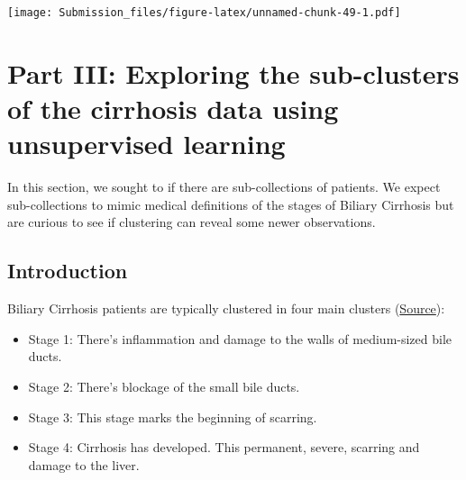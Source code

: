 \documentclass[
]{article}
\newenvironment{Shaded}{\begin{snugshade}}{\end{snugshade}}
\newcommand{\AttributeTok}[1]{\textcolor[rgb]{0.13,0.29,0.53}{#1}}
\newcommand{\CommentTok}[1]{\textcolor[rgb]{0.56,0.35,0.01}{\textit{#1}}}
\newcommand{\ConstantTok}[1]{\textcolor[rgb]{0.56,0.35,0.01}{#1}}
\newcommand{\DecValTok}[1]{\textcolor[rgb]{0.00,0.00,0.81}{#1}}
\newcommand{\FunctionTok}[1]{\textcolor[rgb]{0.13,0.29,0.53}{\textbf{#1}}}
\newcommand{\NormalTok}[1]{#1}
\newcommand{\SpecialCharTok}[1]{\textcolor[rgb]{0.81,0.36,0.00}{\textbf{#1}}}
\newcommand{\StringTok}[1]{\textcolor[rgb]{0.31,0.60,0.02}{#1}}
\begin{document}
\begin{Shaded}
\end{Shaded}

\texttt{[image: Submission\_files/figure-latex/unnamed-chunk-49-1.pdf]}

\hypertarget{part-iii-exploring-the-sub-clusters-of-the-cirrhosis-data-using-unsupervised-learning}{%
\section{Part III: Exploring the sub-clusters of the cirrhosis data
using unsupervised
learning}\label{part-iii-exploring-the-sub-clusters-of-the-cirrhosis-data-using-unsupervised-learning}}

In this section, we sought to if there are sub-collections of patients.
We expect sub-collections to mimic medical definitions of the stages of
Biliary Cirrhosis but are curious to see if clustering can reveal some
newer observations.

\hypertarget{introduction-2}{%
\subsection{Introduction}\label{introduction-2}}

Biliary Cirrhosis patients are typically clustered in four main clusters
(\href{https://www.healthline.com/health/primary-biliary-cirrhosis\#stages}{Source}):

\begin{itemize}
\item
  Stage 1: There's inflammation and damage to the walls of medium-sized
  bile ducts.
\item
  Stage 2: There's blockage of the small bile ducts.
\item
  Stage 3: This stage marks the beginning of scarring.
\item
  Stage 4: Cirrhosis has developed. This permanent, severe, scarring and
  damage to the liver.
\end{itemize}
\end{document}
